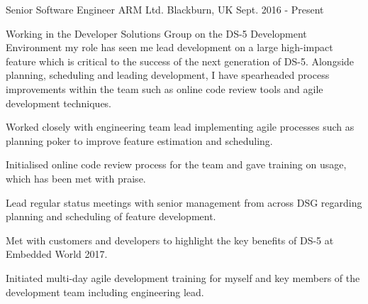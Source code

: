 
\begin{cventries}

  \cventry
    {Senior Software Engineer} %
    {ARM Ltd.} %
    {Blackburn, UK} %
    {Sept. 2016 - Present} %
    {
      \begin{cventrysummary}
      Working in the Developer Solutions Group on the DS-5 Development Environment my role
      has seen me lead development on a large high-impact feature which is critical to
      the success of the next generation of DS-5. Alongside planning, scheduling and leading
      development, I have spearheaded process improvements within the team such as online
      code review tools and agile development techniques.
      \end{cventrysummary}
      \begin{cvitems} %
        \item {Worked closely with engineering team lead implementing agile processes such as planning poker to improve feature estimation and scheduling.}
        \item {Initialised online code review process for the team and gave training on usage, which has been met with praise.}
        \item {Lead regular status meetings with senior management from across DSG regarding planning and scheduling of feature development.}
        \item {Met with customers and developers to highlight the key benefits of DS-5 at Embedded World 2017.}
        \item {Initiated multi-day agile development training for myself and key members of the development team including engineering lead.}
      \end{cvitems}
    }


\end{cventries}
